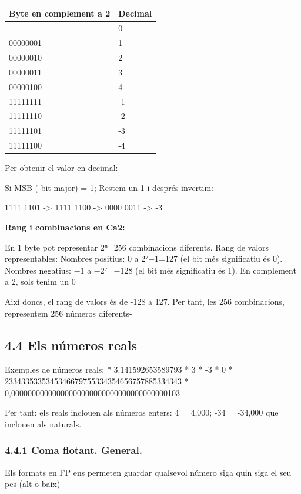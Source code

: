 \documentclass[
  12 pt,
  a4paper,
]{article}
\begin{document}
\begin{longtable}[]{@{}ll@{}}
\toprule\noalign{}
Byte en complement a 2 & Decimal \\
\midrule\noalign{}
\endhead
\bottomrule\noalign{}
\endlastfoot
00000000 & 0 \\
00000001 & 1 \\
00000010 & 2 \\
00000011 & 3 \\
00000100 & 4 \\
11111111 & -1 \\
11111110 & -2 \\
11111101 & -3 \\
11111100 & -4 \\
\end{longtable}

Per obtenir el valor en decimal:

Si MSB ( bit major) = 1; Restem un 1 i després invertim:

1111 1101 -\textgreater{} 1111 1100 -\textgreater{} 0000 0011
-\textgreater{} -3

\textbf{Rang i combinacions en Ca2:}

En 1 byte pot representar 2⁸=256 combinacions diferents. Rang de valors
representables: Nombres positius: 0 a 2⁷−1=127 (el bit més significatiu
és 0). Nombres negatius: −1 a −2⁷=−128 (el bit més significatiu és 1).
En complement a 2, sols tenim un 0

Així doncs, el rang de valors és de -128 a 127. Per tant, les 256
combinacions, representem 256 números diferents-

\subsection{4.4 Els números reals}\label{els-nuxfameros-reals}

Exemples de números reals: * 3.141592653589793 * 3 * -3 * 0 *
2334335335345346679755334354656757885334343 *
0,00000000000000000000000000000000000000103

Per tant: els reals inclouen als números enters: 4 = 4,000; -34 =
-34,000 que inclouen als naturals.

\subsubsection{4.4.1 Coma flotant.
General.}\label{coma-flotant.-general.}

Els formats en FP ens permeten guardar qualsevol número siga quin siga
el seu pes (alt o baix)
\end{document}
